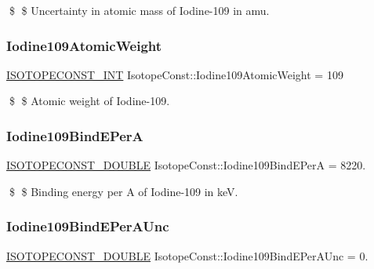 \$ \$ Uncertainty in atomic mass of Iodine-\/109 in amu. \mbox{\label{group___isotope_const-_iodine-_i109_ga1a86b4a6b88da4bd3744e666f5c85688}} 
\subsubsection{\texorpdfstring{Iodine109\+Atomic\+Weight}{Iodine109AtomicWeight}}
{\footnotesize\ttfamily \mbox{\hyperlink{group___isotope_const-_macros_ga5f18360b3e99483a35c32d789e62621c}{I\+S\+O\+T\+O\+P\+E\+C\+O\+N\+S\+T\+\_\+\+I\+NT}} Isotope\+Const\+::\+Iodine109\+Atomic\+Weight = 109}

\$ \$ Atomic weight of Iodine-\/109. \mbox{\label{group___isotope_const-_iodine-_i109_gae7ffaabcbf963c8b613f2a2b7332d9db}} 
\subsubsection{\texorpdfstring{Iodine109\+Bind\+E\+PerA}{Iodine109BindEPerA}}
{\footnotesize\ttfamily \mbox{\hyperlink{group___isotope_const-_macros_ga8f45a7272ce02c0b4c65c44636ed719a}{I\+S\+O\+T\+O\+P\+E\+C\+O\+N\+S\+T\+\_\+\+D\+O\+U\+B\+LE}} Isotope\+Const\+::\+Iodine109\+Bind\+E\+PerA = 8220.}

\$ \$ Binding energy per A of Iodine-\/109 in keV. \mbox{\label{group___isotope_const-_iodine-_i109_ga22c66da564459c8b346cc76f16b9f165}} 
\subsubsection{\texorpdfstring{Iodine109\+Bind\+E\+Per\+A\+Unc}{Iodine109BindEPerAUnc}}
{\footnotesize\ttfamily \mbox{\hyperlink{group___isotope_const-_macros_ga8f45a7272ce02c0b4c65c44636ed719a}{I\+S\+O\+T\+O\+P\+E\+C\+O\+N\+S\+T\+\_\+\+D\+O\+U\+B\+LE}} Isotope\+Const\+::\+Iodine109\+Bind\+E\+Per\+A\+Unc = 0.}

